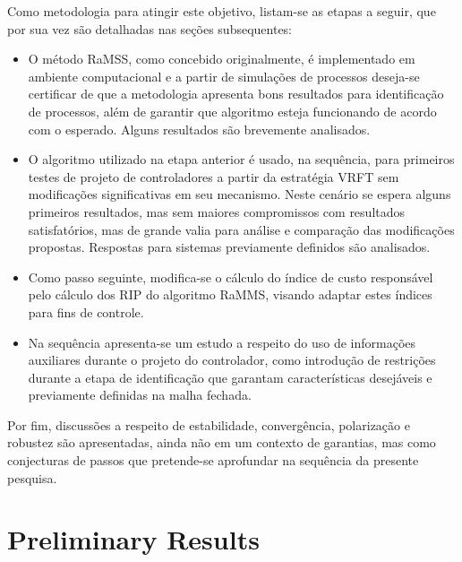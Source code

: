 Como metodologia para atingir este objetivo, listam-se as etapas a seguir, que por sua vez são detalhadas nas seções subsequentes:
\begin{itemize}
  \item O método RaMSS, como concebido originalmente, é implementado em ambiente computacional e a partir de simulações de processos deseja-se certificar de que a metodologia apresenta bons resultados para identificação de processos, além de garantir que algoritmo esteja funcionando de acordo com o esperado. Alguns resultados são brevemente analisados.
  \item O algoritmo utilizado na etapa anterior é usado, na sequência, para primeiros testes de projeto de controladores a partir da estratégia VRFT sem modificações significativas em seu mecanismo. Neste cenário se espera alguns primeiros resultados, mas sem maiores compromissos com resultados satisfatórios, mas de grande valia para análise e comparação das modificações propostas. Respostas para sistemas previamente definidos são analisados.
  \item Como passo seguinte, modifica-se o cálculo do índice de custo responsável pelo cálculo dos RIP do algoritmo RaMMS, visando adaptar estes índices para fins de controle.
  \item Na sequência apresenta-se um estudo a respeito do uso de informações auxiliares durante o projeto do controlador, como introdução de restrições durante a etapa de identificação que garantam características desejáveis e previamente definidas na malha fechada.
\end{itemize}

Por fim, discussões a respeito de estabilidade, convergência, polarização e robustez são apresentadas, ainda não em um contexto de garantias, mas como conjecturas de passos que pretende-se aprofundar na sequência da presente pesquisa.

\section{Preliminary Results}\label{sec:prel_results}


